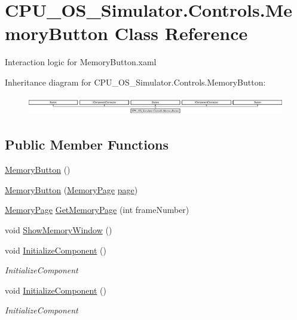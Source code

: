 \hypertarget{class_c_p_u___o_s___simulator_1_1_controls_1_1_memory_button}{}\section{C\+P\+U\+\_\+\+O\+S\+\_\+\+Simulator.\+Controls.\+Memory\+Button Class Reference}
\label{class_c_p_u___o_s___simulator_1_1_controls_1_1_memory_button}


Interaction logic for Memory\+Button.\+xaml  


Inheritance diagram for C\+P\+U\+\_\+\+O\+S\+\_\+\+Simulator.\+Controls.\+Memory\+Button\+:\begin{figure}[H]
\begin{center}
\leavevmode
\includegraphics[height=0.845283cm]{class_c_p_u___o_s___simulator_1_1_controls_1_1_memory_button}
\end{center}
\end{figure}
\subsection*{Public Member Functions}
\begin{DoxyCompactItemize}
\item 
\hyperlink{class_c_p_u___o_s___simulator_1_1_controls_1_1_memory_button_a51d6f0cf574add6fe66c3358a0a22b96}{Memory\+Button} ()
\item 
\hyperlink{class_c_p_u___o_s___simulator_1_1_controls_1_1_memory_button_a13e869adbc72456a6e46556faed500c3}{Memory\+Button} (\hyperlink{class_c_p_u___o_s___simulator_1_1_memory_1_1_memory_page}{Memory\+Page} \hyperlink{class_c_p_u___o_s___simulator_1_1_controls_1_1_memory_button_a11e523d7bb59a28d303233a4198b1abe}{page})
\item 
\hyperlink{class_c_p_u___o_s___simulator_1_1_memory_1_1_memory_page}{Memory\+Page} \hyperlink{class_c_p_u___o_s___simulator_1_1_controls_1_1_memory_button_aa9c8f2ec6a0fda4d6455205d1b93fcd4}{Get\+Memory\+Page} (int frame\+Number)
\item 
void \hyperlink{class_c_p_u___o_s___simulator_1_1_controls_1_1_memory_button_a7eacdf0d3111bc3dc748faa52ba7054d}{Show\+Memory\+Window} ()
\item 
void \hyperlink{class_c_p_u___o_s___simulator_1_1_controls_1_1_memory_button_a9d09a3345e5f4e12a944476435e50b7d}{Initialize\+Component} ()
\begin{DoxyCompactList}\small\item\em Initialize\+Component \end{DoxyCompactList}\item 
void \hyperlink{class_c_p_u___o_s___simulator_1_1_controls_1_1_memory_button_a9d09a3345e5f4e12a944476435e50b7d}{Initialize\+Component} ()
\begin{DoxyCompactList}\small\item\em Initialize\+Component \end{DoxyCompactList}\end{DoxyCompactItemize}
